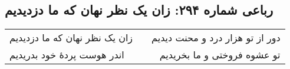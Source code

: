 \begin{center}
\section*{رباعی شماره ۲۹۴: زان یک نظر نهان که ما دزدیدیم}
\label{sec:sh294}
\begin{longtable}{l p{0.5cm} r}
زان یک نظر نهان که ما دزدیدیم
&&
دور از تو هزار درد و محنت دیدیم
\\
اندر هوست پردهٔ خود بدریدیم
&&
تو عشوه فروختی و ما بخریدیم
\\
\end{longtable}
\end{center}
